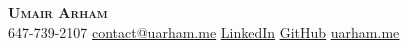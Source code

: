 \begin{center}
    \textbf{\Huge \scshape Umair Arham} \\ \vspace{1pt}
     \small 647-739-2107 \quad
    \href{mailto:hi@uarham.me}{ \underline{contact@uarham.me}} \quad
    \href{https://www.linkedin.com/in/umairx25/}{ \underline{LinkedIn}} \quad
    \href{https://github.com/umairx25/}
    { \underline{GitHub}}
    \quad
    \href{https://uarham.me/}{ \underline{uarham.me}} \quad
    
\end{center}
